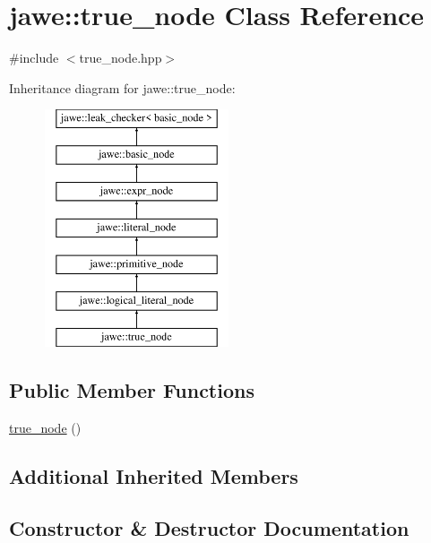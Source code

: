 \hypertarget{classjawe_1_1true__node}{}\section{jawe\+:\+:true\+\_\+node Class Reference}
\label{classjawe_1_1true__node}


{\ttfamily \#include $<$true\+\_\+node.\+hpp$>$}

Inheritance diagram for jawe\+:\+:true\+\_\+node\+:\begin{figure}[H]
\begin{center}
\leavevmode
\includegraphics[height=7.000000cm]{classjawe_1_1true__node}
\end{center}
\end{figure}
\subsection*{Public Member Functions}
\begin{DoxyCompactItemize}
\item 
\hyperlink{classjawe_1_1true__node_a3ceddcaead9e56ad252e11df51cf39a7}{true\+\_\+node} ()
\end{DoxyCompactItemize}
\subsection*{Additional Inherited Members}


\subsection{Constructor \& Destructor Documentation}
\mbox{\label{classjawe_1_1true__node_a3ceddcaead9e56ad252e11df51cf39a7}} 
